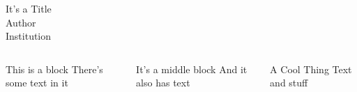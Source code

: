 \documentclass[final]{beamer}
\begin{document}
\begin{frame}{}

\vfill

\begin{columns}[totalwidth=\textwidth]
\begin{column}{\textwidth}
\begin{block}{\centering \vspace{10mm} \Huge{It's a Title}\\\huge{Author\\Institution}\vspace{10mm}}
\end{block}
\end{column}
\end{columns}

\begin{columns}[totalwidth=\textwidth]

\begin{column}{0.31\textwidth}
  \begin{block}{\centering \vspace{3mm} \LARGE This is a block \vspace{3mm}}
    There's some text in it
  \end{block}
\end{column}

\begin{column}{0.31\textwidth}
  \begin{block}{\centering \vspace{3mm} \LARGE It's a middle block}
    And it also has text
  \end{block}
\end{column}

\begin{column}{0.31\textwidth}
  \begin{block}{\centering \vspace{3mm} \LARGE A Cool Thing \vspace{3mm}}
    Text and stuff  
  \end{block}
\end{column}

\end{columns}

\vfill

\end{frame}
\end{document}
